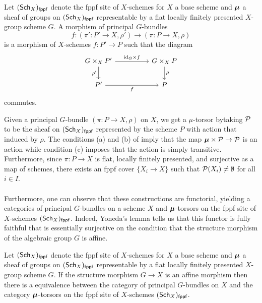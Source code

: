 \begin{definition}\label{def: morphism of principal G bundles}
    Let $(\mathsf{Sch}_{X})_{\mathsf{fppf}}$ denote the fppf site of $X$-schemes for $X$ a base scheme and $\bm{\mu}$ a sheaf of groups on $(\mathsf{Sch}_{X})_{\mathsf{fppf}}$ representable by a flat locally finitely presented $X$-group scheme $G$. A morphism of principal $G$-bundles 
    $$f:(\pi':P'\to X,\rho')\to(\pi:P\to X,\rho)$$
    is a morphism of $X$-schemes $f:P'\to P$ such that the diagram 
    $$%
    \begin{tikzcd}
        {G\times_{X}P'} && {G\times_{X}P} \\
        {P'} && P
        \arrow["f"', from=2-1, to=2-3]
        \arrow["{\id_{G}\times f}", from=1-1, to=1-3]
        \arrow["{\rho'}"', from=1-1, to=2-1]
        \arrow["\rho", from=1-3, to=2-3]
    \end{tikzcd}$$
    commutes. 
\end{definition}
Given a principal $G$-bundle $(\pi:P\to X,\rho)$ on $X$, we get a $\mu$-torsor bytaking $\mathcal{P}$ to be the sheaf on $(\mathsf{Sch}_{X})_{\mathsf{fppf}}$ represented by the scheme $P$ with action that induced by $\rho$. The conditions (a) and (b) of  imply that the map $\bm{\mu}\times\mathcal{P}\to\mathcal{P}$ is an action while condition (c) imposes that the action is simply transitive. Furthermore, since $\pi:P\to X$ is flat, locally finitely presented, and surjective as a map of schemes, there exists an fppf cover $\{X_{i}\to X\}$ such that $\mathcal{P}(X_{i})\neq\emptyset$ for all $i\in I$. 
\\\\
Furthermore, one can observe that these constructions are functorial, yielding a categories of principal $G$-bundles on a scheme $X$ and $\bm{\mu}$-torsors on the fppf site of $X$-schemes $(\mathsf{Sch}_{X})_{\mathsf{fppf}}$. Indeed, Yoneda's lemma tells us that this functor is fully faithful that is essentially surjective on the condition that the structure morphism of the algebraic group $G$ is affine. 
\begin{proposition}\label{prop: if affine then G bundles are mu torsors}
    Let $(\mathsf{Sch}_{X})_{\mathsf{fppf}}$ denote the fppf site of $X$-schemes for $X$ a base scheme and $\bm{\mu}$ a sheaf of groups on $(\mathsf{Sch}_{X})_{\mathsf{fppf}}$ representable by a flat locally finitely presented $X$-group scheme $G$. If the structure morphism $G\to X$ is an affine morphism then there is a equivalence between the category of principal $G$-bundles on $X$ and the category $\bm{\mu}$-torsors on the fppf site of $X$-schemes $(\mathsf{Sch}_{X})_{\mathsf{fppf}}$.
\end{proposition}

